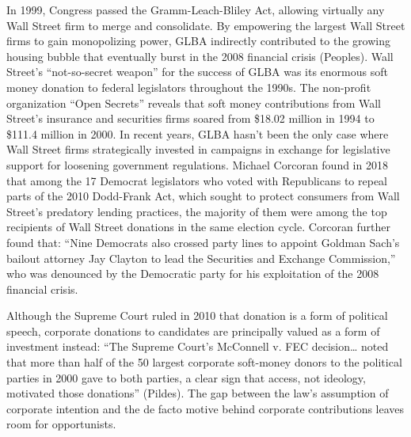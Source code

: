 \documentclass[12pt, a4paper, twoside]{article}
\begin{document}
In 1999, Congress passed the Gramm-Leach-Bliley Act, allowing virtually any Wall Street firm to merge and consolidate. By empowering the largest Wall Street firms to gain monopolizing power, GLBA indirectly contributed to the growing housing bubble that eventually burst in the 2008 financial crisis (Peoples). Wall Street’s “not-so-secret weapon” for the success of GLBA was its enormous soft money donation to federal legislators throughout the 1990s. The non-profit organization “Open Secrets” reveals that soft money contributions from Wall Street’s insurance and securities firms soared from \$18.02 million in 1994 to \$111.4 million in 2000. In recent years, GLBA hasn’t been the only case where Wall Street firms strategically invested in campaigns in exchange for legislative support for loosening government regulations. Michael Corcoran found in 2018 that among the 17 Democrat legislators who voted with Republicans to repeal parts of the 2010 Dodd-Frank Act, which sought to protect consumers from Wall Street’s predatory lending practices, the majority of them were among the top recipients of Wall Street donations in the same election cycle. Corcoran further found that: “Nine Democrats also crossed party lines to appoint Goldman Sach’s bailout attorney Jay Clayton to lead the Securities and Exchange Commission,” who was denounced by the Democratic party for his exploitation of the 2008 financial crisis. 

Although the Supreme Court ruled in 2010 that donation is a form of political speech, corporate donations to candidates are principally valued as a form of investment instead: “The Supreme Court’s McConnell v. FEC decision… noted that more than half of the 50 largest corporate soft-money donors to the political parties in 2000 gave to both parties, a clear sign that access, not ideology, motivated those donations” (Pildes). The gap between the law’s assumption of corporate intention and the de facto motive behind corporate contributions leaves room for opportunists. 
\end{document}

